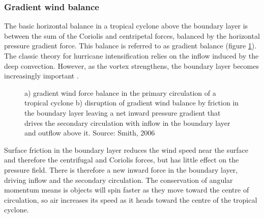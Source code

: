 \subsubsection{Gradient wind balance}%

The basic horizontal balance in a tropical cyclone above the boundary layer is between the sum of the Coriolis and centripetal forces, balanced by the horizontal pressure gradient force. This balance is referred to as gradient balance (figure \ref{fig:cyclone_circ}). %
The classic theory for hurricane intensification relies on the inflow induced by the deep convection. However, as the vortex strengthens, the boundary layer becomes increasingly important \citep{under_hurr}.




\begin{figure}[h]
	\centering
	
	\caption{a) gradient wind force balance in the primary circulation of a tropical cyclone b) disruption of gradient wind balance by friction in the boundary layer leaving a net inward pressure gradient that drives the secondary circulation with inflow in the boundary layer and outflow above it. Source: Smith, 2006}\label{fig:cyclone_circ}
\end{figure}

Surface friction in the boundary layer reduces the wind speed near the surface and therefore the centrifugal and Coriolis forces, but has little effect on the pressure field. There is therefore a new inward force in the boundary layer, driving inflow and the secondary circulation. The conservation of angular momentum means is objects will spin faster as they move toward the centre of circulation, so air increases its speed as it heads toward the centre of the tropical cyclone.


